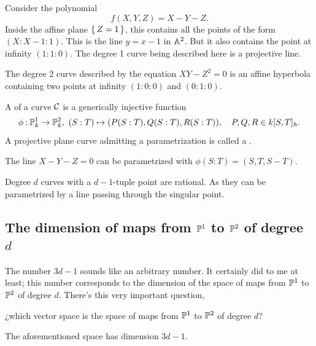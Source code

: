\documentclass[12pt]{memoir}
\begin{document}
\begin{Ex}
Consider the polynomial 
$$f(X,Y,Z)=X-Y-Z.$$
Inside the affine plane $\{\,Z=1\,\}$, this contains all the points of the form $(X:X-1:1)$. This is the line $y=x-1$ in $\mathbb{A}^2$. But it also contains the point at infinity $(1:1:0)$. The degree 1 curve being described here is a projective line.
\end{Ex}

\begin{Ex}
    The degree 2 curve described by the equation $XY-Z^2=0$ is an affine hyperbola containing two points at infinity $(1:0:0)$ and $(0:1:0)$. 
\end{Ex}

\begin{Def}
A  of a curve $\mathcal{C}$ is a generically injective function $$\phi\:\bP^1_k\to\bP^2_k,\ (S:T)\mapsto(P(S:T),Q(S:T),R(S:T)),\quad P,Q,R\in k[S,T]_h.$$
A projective plane curve admitting a parametrization is called a .
\end{Def}

\begin{Ex}
    The line $X-Y-Z=0$ can be parametrized with $\phi(S:T)=(S,T,S-T)$. 
\end{Ex}

\begin{Ex}
    Degree $d$ curves with a $d-1$-tuple point are rational. As they can be parametrized by a line passing through the singular point. 
\end{Ex}

\subsection{The dimension of maps from $\mathbb{P}^1$ to $\mathbb{P}^2$ of degree $d$}

The number $3d-1$ sounds like an arbitrary number. It certainly did to me at least; this number corresponds to the dimension of the space of maps from $\mathbb{P}^1$ to $\mathbb{P}^2$ of degree $d$. There's this very important question, 
\begin{significant}
¿which vector space is the space of maps from $\mathbb{P}^1$ to $\mathbb{P}^2$  of degree $d$?
\end{significant}

\begin{Prop}\label{prop-dimension-maps-P1-to-P2}
The aforementioned space has dimension $3d-1$.
\end{Prop}
\end{document}
